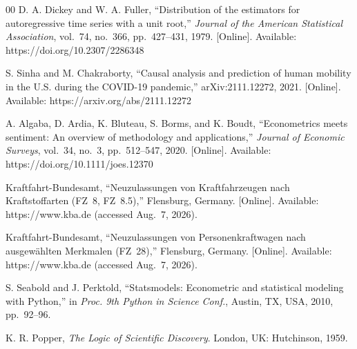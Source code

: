 \documentclass[conference]{IEEEtran}
\begin{document}
\begin{thebibliography}{00}
 D. A. Dickey and W. A. Fuller, ``Distribution of the
estimators for autoregressive time series with a unit root,'' \emph{Journal of
the American Statistical Association}, vol.~74, no.~366, pp.~427--431, 1979.
[Online]. Available: https://doi.org/10.2307/2286348

 S. Sinha and M. Chakraborty, ``Causal analysis and
prediction of human mobility in the U.S. during the COVID-19 pandemic,''
arXiv:2111.12272, 2021. [Online]. Available: https://arxiv.org/abs/2111.12272

 A. Algaba, D. Ardia, K. Bluteau, S. Borms, and K. Boudt,
``Econometrics meets sentiment: An overview of methodology and applications,''
\emph{Journal of Economic Surveys}, vol.~34, no.~3, pp.~512--547, 2020.
[Online]. Available: https://doi.org/10.1111/joes.12370

 Kraftfahrt-Bundesamt, ``Neuzulassungen von Kraftfahrzeugen
nach Kraftstoffarten (FZ~8, FZ~8.5),'' Flensburg, Germany. [Online].
Available: https://www.kba.de (accessed Aug.~7, 2026).

 Kraftfahrt-Bundesamt, ``Neuzulassungen von
Personenkraftwagen nach ausgew\"ahlten Merkmalen (FZ~28),'' Flensburg,
Germany. [Online]. Available: https://www.kba.de (accessed Aug.~7, 2026).

 S. Seabold and J. Perktold, ``Statsmodels: Econometric
and statistical modeling with Python,'' in \emph{Proc. 9th Python in Science
Conf.}, Austin, TX, USA, 2010, pp.~92--96.

 K. R. Popper, \emph{The Logic of Scientific Discovery}.
London, UK: Hutchinson, 1959.

\end{thebibliography}
\end{document}

